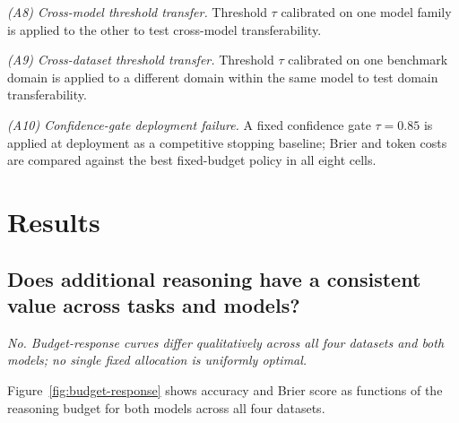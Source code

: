 \documentclass[a4paper,fleqn]{cas-sc}
\theoremstyle{plain}
\theoremstyle{definition}
\theoremstyle{remark}
\begin{document}
\emph{(A8) Cross-model threshold transfer.}
Threshold $\tau$ calibrated on one model family is applied to the other
to test cross-model transferability.

\emph{(A9) Cross-dataset threshold transfer.}
Threshold $\tau$ calibrated on one benchmark domain is applied to a different
domain within the same model to test domain transferability.

\emph{(A10) Confidence-gate deployment failure.}
A fixed confidence gate $\tau{=}0.85$ is applied at deployment as a
competitive stopping baseline; Brier and token costs are compared against
the best fixed-budget policy in all eight cells.

\section{Results}
\label{sec:results}

\subsection{Does additional reasoning have a consistent value across tasks
  and models?}
\label{sec:heterogeneous}

\textit{No. Budget-response curves differ qualitatively across all four
datasets and both models; no single fixed allocation is uniformly optimal.}

Figure~\ref{fig:budget-response} shows accuracy and Brier score as functions
of the reasoning budget for both models across all four datasets.

\end{document}
